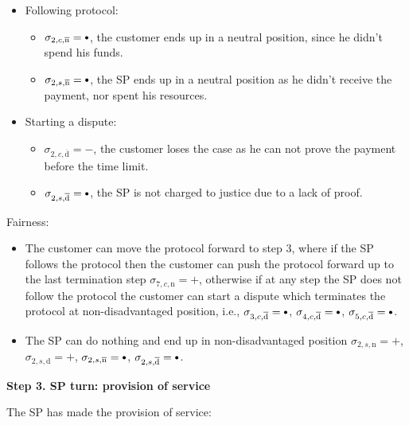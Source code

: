 \documentclass{ieeeaccess}
\newcommand\sbullet[1][.75]{\mathbin{\ThisStyle{\vcenter{\hbox{%
  \scalebox{#1}{$\SavedStyle\bullet$}}}}}%
}
\begin{document}
\begin{itemize}
\item
  Following protocol:
  \begin{itemize}
  \item
    \(\sigma_{2, c, \overline{\mathrm{n}}} = \sbullet\), the customer ends up in a neutral position, since he didn't spend his funds.
  \item
    \(\sigma_{2, s, \overline{\mathrm{n}}} = \sbullet\), the SP ends up in a neutral position as he didn't receive the payment, nor spent his resources.
  \end{itemize}
\item
  Starting a dispute:

  \begin{itemize}
  
  \item
    \(\sigma_{2, c, \overline{\mathrm{d}}} = -\), the customer loses the case as he can not prove the payment before the time limit.
  \item
    \(\sigma_{2, s, \overline{\mathrm{d}}} = \sbullet\), the SP is not charged to justice due to a lack of proof.
  \end{itemize}
\end{itemize}

Fairness:

\begin{itemize}

\item
  The customer can move the protocol forward to step 3, where if the
  SP follows the protocol then the customer can push the protocol forward
  up to the last termination step \(\sigma_{7, c, \mathrm{n}} = +\),
  otherwise if at any step the SP does not follow the protocol the
  customer can start a dispute which terminates the protocol at
  non-disadvantaged position, i.e.,
  \(\sigma_{3, c, \overline{\mathrm{d}}} = \sbullet\),
  \(\sigma_{4, c, \overline{\mathrm{d}}} = \sbullet\),
  \(\sigma_{5, c, \overline{\mathrm{d}}} = \sbullet\).
\item
  The SP can do nothing and end up in non-disadvantaged position
  \(\sigma_{2, s, \mathrm{n}} = +\), \(\sigma_{2, s, \mathrm{d}} = +\),
  \(\sigma_{2, s, \overline{\mathrm{n}}} = \sbullet\),
  \(\sigma_{2, s, \overline{\mathrm{d}}} = \sbullet\).
\end{itemize}

\noindent \textbf
{Step 3. SP turn: provision of service}\label{step-3-provision-of-service}

The SP has made the provision of service:
\end{document}
